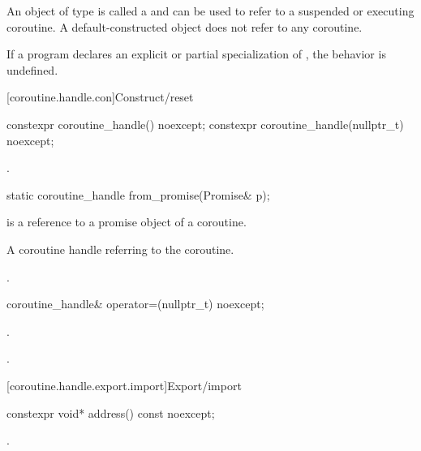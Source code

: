 \pnum
An object of type
 is called a 
and can be used to refer to a suspended or executing coroutine.
A default-constructed  object does not refer to any
coroutine.

\pnum
If a program declares an explicit or partial specialization of
, the behavior is undefined.

[coroutine.handle.con]{Construct/reset}

%
\begin{itemdecl}
constexpr coroutine_handle() noexcept;
constexpr coroutine_handle(nullptr_t) noexcept;
\end{itemdecl}

\begin{itemdescr}
\pnum
\ensures {}.
\end{itemdescr}

%
\begin{itemdecl}
static coroutine_handle from_promise(Promise& p);
\end{itemdecl}

\begin{itemdescr}
\pnum
\requires {} is a reference to a promise object of a coroutine.

\pnum
\returns A coroutine handle  referring to the coroutine.

\pnum
\ensures {}.
\end{itemdescr}

%
\begin{itemdecl}
coroutine_handle& operator=(nullptr_t) noexcept;
\end{itemdecl}

\begin{itemdescr}
\pnum
\ensures {}.

\pnum
\returns {}.
\end{itemdescr}

[coroutine.handle.export.import]{Export/import}

%
\begin{itemdecl}
constexpr void* address() const noexcept;
\end{itemdecl}

\begin{itemdescr}
\pnum
\returns {}.
\end{itemdescr}

